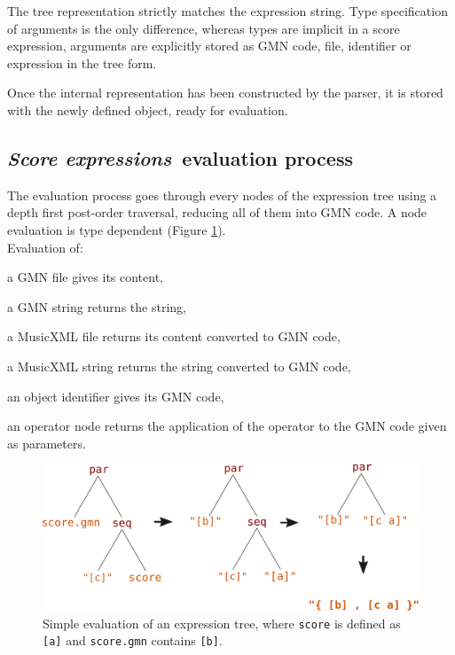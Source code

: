 \documentclass{article}
\newcommand{\OSC}[1]{{\fontsize{9.5pt}{10pt} \selectfont\texttt{#1}}}
\newcommand{\SExpr}{\emph{Score expressions}}
\let\olditemize\itemize
\let\oldenditemize\enditemize
\renewenvironment{itemize} 	{\olditemize \setlength{\itemsep}{1mm}}{\oldenditemize}
\begin{document}
{The tree representation strictly matches the expression string. Type specification of arguments is the only difference, whereas types are implicit in a score expression, arguments are explicitly stored as GMN code, file, identifier or expression in the tree form. 

Once the internal representation has been constructed by the parser, it is stored with the newly defined object, ready for evaluation.

\subsection{\SExpr\ evaluation process}
The evaluation process goes through every nodes of the expression tree using a depth first post-order traversal, reducing all of them into GMN code.
A node evaluation is type dependent (Figure \ref{fig:classicEval}). \\
Evaluation of:  
\begin{itemize}
\item a GMN file gives its content,
\item a GMN string returns the string,
\item a MusicXML file returns its content converted to GMN code,
\item a MusicXML string returns the string converted to GMN code,
\item an object identifier gives its GMN code,
\item an operator node returns the application of the operator to the GMN code given as parameters.
\end{itemize}

\begin{figure}[th]
\centering
\includegraphics[width=1\columnwidth]{imgs/classicEval}
\caption{Simple evaluation of an expression tree,
where \OSC{score} is defined as \OSC{[a]}
and \OSC{score.gmn} contains \OSC{[b]}.
\label{fig:classicEval} }
\end{figure}

}
\end{document}
